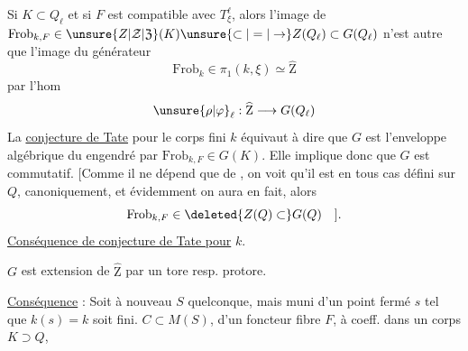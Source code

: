 Si $K\subset Q_\ell$ et si $F$ est compatible avec $T^\ell_\xi$, alors l'image de $\mathrm{Frob}_{k,F}\in \unsure{Z|\mathcal Z|\mathfrak Z}(K)\unsure{\subset|=|\to}Z(Q_\ell)\subset G(Q_\ell)$  n'est autre que l'image du  générateur
\[
\mathrm{Frob}_k\in\pi_1(k,\xi)\simeq\widehat{\mathrm Z}
\]
par l'hom
\[
\unsure{\rho|\varphi}_\ell:\widehat{\mathrm Z}\longrightarrow G(Q_\ell)
\]
La \uline{conjecture de Tate} pour le corps fini $k$ équivaut à dire que $G$ est l'enveloppe algébrique du  engendré par $\mathrm{Frob}_{k,F}\in G(K)$. Elle implique donc que $G$ est commutatif. [Comme il ne dépend que de , on voit qu'il est en tous cas défini sur $Q$, canoniquement, et évidemment on aura en fait, alors
\[
\mathrm{Frob}_{k,F}\in\deleted{Z(Q)\subset}G(Q)\quad ].
\]
\uline{Conséquence de conjecture de Tate pour} $k$.

$G$ est extension  de $\widehat{\mathrm Z}$ par un tore resp. protore.

\uline{Conséquence} : Soit à nouveau $S$ quelconque, mais muni d'un point fermé $s$ tel que $k(s)=k$ soit fini.  $C\subset M(S)$,  d'un foncteur fibre $F$, à coeff. dans un corps $K\supset Q$,

